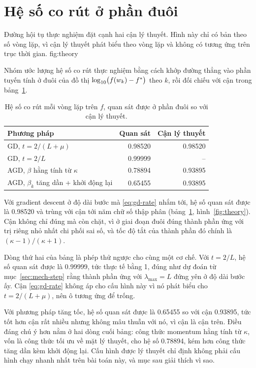 \section{Hệ số co rút ở phần đuôi}
\label{sec:theory-tail}

  {Đường hội tụ thực nghiệm đặt cạnh hai cận lý thuyết. Hình này chỉ có bản theo
   số vòng lặp, vì cận lý thuyết phát biểu theo vòng lặp và không có tương ứng
   trên trục thời gian.}
  {fig:theory}

Nhóm ước lượng hệ số co rút thực nghiệm bằng cách khớp đường thẳng vào phần tuyến
tính ở đuôi của đồ thị $\log_{10}\bigl(f(w_k) - f^{*}\bigr)$ theo $k$, rồi đối
chiếu với cận trong bảng~\ref{tab:rates}.

\begin{table}[tp]
  \centering
  \caption{Hệ số co rút mỗi vòng lặp trên $f$, quan sát được ở phần đuôi so với
    cận lý thuyết.}
  \label{tab:rates}
  \begin{tabular}{lrr}
    \toprule
    Phương pháp & Quan sát & Cận lý thuyết \\
    \midrule
    GD, $t = 2/(L+\mu)$                     & \num{0.98520} & \num{0.98520} \\
    GD, $t = 2/L$                           & \num{0.99999} & --            \\
    AGD, $\beta$ hằng tính từ $\kappa$      & \num{0.78894} & \num{0.93895} \\
    AGD, $\beta_k$ tăng dần + khởi động lại & \num{0.65455} & \num{0.93895} \\
    \bottomrule
  \end{tabular}
\end{table}

Với gradient descent ở độ dài bước mà \eqref{eq:gd-rate} nhắm tới, hệ số quan sát
được là \num{0.98520} và trùng với cận tới năm chữ số thập phân
(bảng~\ref{tab:rates}, hình~\ref{fig:theory}). Cận không chỉ đúng mà còn chặt, vì
ở giai đoạn đuôi đúng thành phần ứng với trị riêng nhỏ nhất chi phối sai số, và
tốc độ tắt của thành phần đó chính là $(\kappa-1)/(\kappa+1)$.

Dòng thứ hai của bảng là phép thử ngược cho cùng một cơ chế. Với $t = 2/L$, hệ số
quan sát được là \num{0.99999}, tức thực tế bằng 1, đúng như dự đoán từ
mục~\ref{sec:mech-step} rằng thành phần ứng với $\lambda_{\max} = L$ đứng yên ở
độ dài bước ấy. Cận \eqref{eq:gd-rate} không áp cho cấu hình này vì nó phát biểu
cho $t = 2/(L+\mu)$, nên ô tương ứng để trống.

Với phương pháp tăng tốc, hệ số quan sát được là \num{0.65455} so với cận
\num{0.93895}, tức tốt hơn cận rất nhiều nhưng không mâu thuẫn với nó, vì cận là
cận trên. Điều đáng chú ý hơn nằm ở hai dòng cuối bảng: công thức momentum hằng
tính từ $\kappa$, vốn là công thức tối ưu về mặt lý thuyết, cho hệ số
\num{0.78894}, kém hơn công thức tăng dần kèm khởi động lại. Cấu hình được lý
thuyết chỉ định không phải cấu hình chạy nhanh nhất trên bài toán này, và mục sau
giải thích vì sao.

